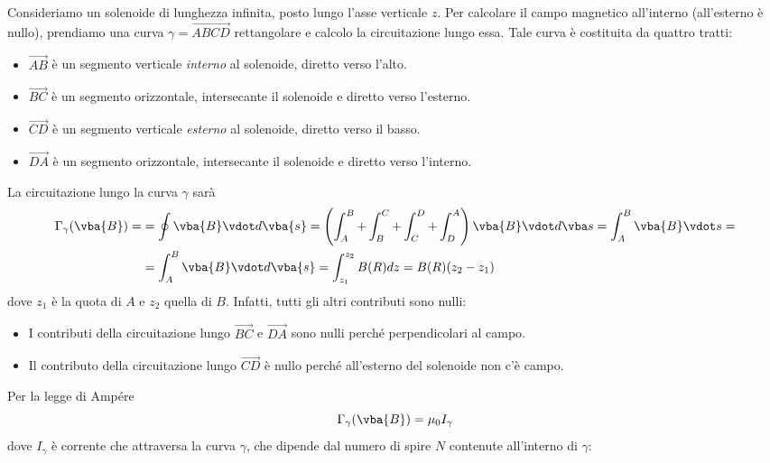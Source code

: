 \begin{examplewt}
	Consideriamo un solenoide di lunghezza infinita, posto lungo l'asse verticale $z$. Per calcolare il campo magnetico all'interno (all'esterno è nullo), prendiamo una curva $\gamma=\overrightarrow{ABCD}$ rettangolare e calcolo la circuitazione lungo essa. Tale curva è costituita da quattro tratti:
	\begin{itemize}
		\item $\overrightarrow{AB}$ è un segmento verticale \textit{interno} al solenoide, diretto verso l'alto.
		\item $\overrightarrow{BC}$ è un segmento orizzontale, intersecante il solenoide e diretto verso l'esterno.
		\item $\overrightarrow{CD}$ è un segmento verticale \textit{esterno} al solenoide, diretto verso il basso.
		\item $\overrightarrow{DA}$ è un segmento orizzontale, intersecante il solenoide e diretto verso l'interno.
	\end{itemize}
	La circuitazione lungo la curva $\gamma$ sarà
	\begin{align*}
		\Gamma_{\gamma}(\vba{B})=&=\oint\vba{B}\vdot d\vba{s}=\left( \int_A^B + \int_B^C + \int_C^D + \int_D^A  \right) \vba{B}\vdot d\vba s= \int^B_A \vba{B}\vdot s=\\
		&=\int_{A}^{B}\vba{B}\vdot d\vba{s}=\int^{z_2}_{z_1} B(R)dz=B(R)(z_2-z_1)
	\end{align*}
	dove $z_1$ è la quota di $A$ e $z_2$ quella di $B$. Infatti, tutti gli altri contributi sono nulli:
	\begin{itemize}
		\item I contributi della circuitazione lungo  $\overrightarrow{BC}$ e $\overrightarrow{DA}$ sono nulli perché perpendicolari al campo.
		\item Il contributo della circuitazione lungo $\overrightarrow{CD}$ è nullo perché all'esterno del solenoide non c'è campo.
	\end{itemize}
	Per la legge di Ampére
	\begin{equation*}
		\Gamma_{\gamma}(\vba{B})=\mu_0I_\gamma
	\end{equation*}
	dove $I_\gamma$ è corrente che attraversa la curva $\gamma$, che dipende dal numero di spire $N$ contenute all'interno di $\gamma$:

\end{examplewt}
